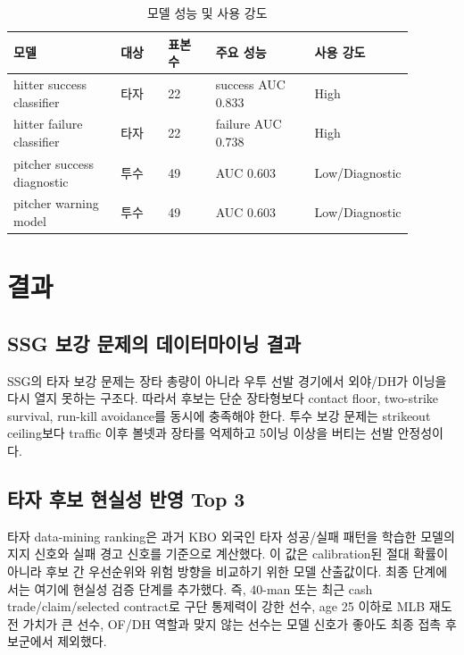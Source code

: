 \documentclass[11pt,a4paper]{article}
\begin{document}
\begin{table}[H]
\centering
\caption{모델 성능 및 사용 강도}
\label{tab:model_perf}
\small
\begin{tabularx}{\linewidth}{L{0.27\linewidth}C{0.12\linewidth}C{0.12\linewidth}L{0.25\linewidth}L{0.13\linewidth}}
\toprule
모델 & 대상 & 표본 수 & 주요 성능 & 사용 강도 \\
\midrule
hitter success classifier & 타자 & 22 & success AUC 0.833 & High \\
hitter failure classifier & 타자 & 22 & failure AUC 0.738 & High \\
pitcher success diagnostic & 투수 & 49 & AUC 0.603 & Low/Diagnostic \\
pitcher warning model & 투수 & 49 & AUC 0.603 & Low/Diagnostic \\
\bottomrule
\end{tabularx}
\end{table}

\section{결과}

\subsection{SSG 보강 문제의 데이터마이닝 결과}
SSG의 타자 보강 문제는 장타 총량이 아니라 우투 선발 경기에서 외야/DH가 이닝을 다시 열지 못하는 구조다. 따라서 후보는 단순 장타형보다 contact floor, two-strike survival, run-kill avoidance를 동시에 충족해야 한다. 투수 보강 문제는 strikeout ceiling보다 traffic 이후 볼넷과 장타를 억제하고 5이닝 이상을 버티는 선발 안정성이다.

\subsection{타자 후보 현실성 반영 Top 3}
타자 data-mining ranking은 과거 KBO 외국인 타자 성공/실패 패턴을 학습한 모델의 지지 신호와 실패 경고 신호를 기준으로 계산했다. 이 값은 calibration된 절대 확률이 아니라 후보 간 우선순위와 위험 방향을 비교하기 위한 모델 산출값이다. 최종 단계에서는 여기에 현실성 검증 단계를 추가했다. 즉, 40-man 또는 최근 cash trade/claim/selected contract로 구단 통제력이 강한 선수, age 25 이하로 MLB 재도전 가치가 큰 선수, OF/DH 역할과 맞지 않는 선수는 모델 신호가 좋아도 최종 접촉 후보군에서 제외했다.
\end{document}
